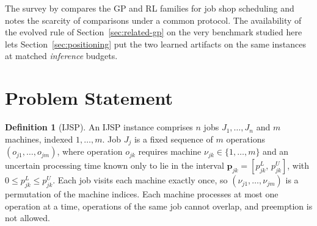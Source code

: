 \documentclass[preprint,12pt]{elsarticle}
\theoremstyle{definition}
\newtheorem{definition}{Definition}
\theoremstyle{remark}
\begin{document}
The survey by \citet{Xu2025} compares the GP and RL families for job
shop scheduling and notes the scarcity of comparisons under a common
protocol. The availability of the evolved rule of
Section~\ref{sec:related-gp} on the very benchmark studied here lets
Section~\ref{sec:positioning} put the two learned artifacts on the
same instances at matched \emph{inference} budgets.

\section{Problem Statement}
\label{sec:problem}

\begin{definition}[IJSP]
An IJSP instance comprises $n$ jobs $J_1,\dots,J_n$ and $m$ machines,
indexed $1,\dots,m$.
Job $J_j$ is a fixed sequence of $m$ operations
$(o_{j1},\dots,o_{jm})$, where operation $o_{jk}$ requires machine
$\nu_{jk}\in\{1,\dots,m\}$ and an uncertain processing time known
only to lie in the interval
$\mathbf{p}_{jk}=[p^{L}_{jk},\,p^{U}_{jk}]$, with $0\le p^L_{jk}\le
p^U_{jk}$. Each job visits each machine exactly once, so
$(\nu_{j1},\dots,\nu_{jm})$ is a permutation of the machine indices.
Each machine processes at most one operation at a time, operations of
the same job cannot overlap, and preemption is not allowed.
\end{definition}
\end{document}
